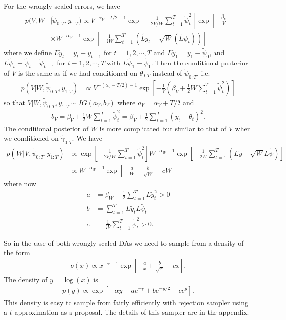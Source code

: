 \documentclass{article}
\begin{document}
For the wrongly scaled errors, we have
\begin{align}
  p(V,W&|\tilde{\psi}_{0:T},y_{1:T}) \propto V^{-\alpha_V - T/2 -1}\exp\left[-\frac{1}{2V/W}\sum_{t=1}^T\tilde{\psi}_t^2\right]\exp\left[-\frac{\beta_V}{V}\right]\nonumber\\
  &\times W^{-\alpha_W-1}\exp\left[-\frac{1}{2W}\sum_{t=1}^T\left(\tilde{Ly}_t - \sqrt{W}(\tilde{L\psi}_t)\right)\right]\label{llmwerrorpost}
\end{align}
where we define $L\tilde{y}_t = y_t - y_{t-1}$ for $t=1,2,\cdots,T$ and $L\tilde{y}_1=y_1 - \tilde{\psi}_0$, and $L\tilde{\psi}_t=\tilde{\psi}_t-\tilde{\psi}_{t-1}$ for $t=1,2,\cdots,T$ with $L\tilde{\psi}_1=\tilde{\psi}_1$. Then the conditional posterior of $V$ is the same as if we had conditioned on $\theta_{0:T}$ instead of $\tilde{\psi}_{0:T}$, i.e.
\begin{align*}
  p(V|W,\tilde{\psi}_{0:T},y_{1:T}) & \propto V^{-(\alpha_V - T/2)-1}\exp\left[-\frac{1}{V}\left(\beta_V + \frac{1}{2}W\sum_{t=1}^T\tilde{\psi}_t^2\right)\right]
\end{align*}
so that $V|W,\tilde{\psi}_{0:T},y_{1:T}\sim IG(a_V, b_V)$ where $a_V = \alpha_V + T/2$ and
\begin{align*}
  b_V = \beta_V + \frac{1}{2}W\sum_{t=1}^T\tilde{\psi}_t^2 = \beta_V + \frac{1}{2}\sum_{t=1}^T(y_t - \theta_t)^2.
\end{align*}
The conditional posterior of $W$ is more complicated but similar to that of $V$ when we conditioned on $\tilde{\gamma}_{0:T}$. We have
\begin{align*}
  p(W|V,\tilde{\psi}_{0:T},y_{1:T}) &\propto \exp\left[-\frac{1}{2V/W}\sum_{t=1}^T\tilde{\psi}_t^2\right] W^{-\alpha_W-1}\exp\left[-\frac{1}{2W}\sum_{t=1}^T\left(L\tilde{y} - \sqrt{W}L\tilde{\psi}\right)\right]\\
  &\propto W^{-\alpha_W - 1}\exp\left[-\frac{a}{W} + \frac{b}{\sqrt{W}} - cW\right]
\end{align*}
where now
\begin{align*}
  a & = \beta_W + \frac{1}{2}\sum_{t=1}^TL\tilde{y}_t^2 > 0\\
  b & = \sum_{t=1}^TL\tilde{y}_tL\tilde{\psi}_t\\
  c & = \frac{1}{2V}\sum_{t=1}^T\tilde{\psi}_t^2 > 0.
\end{align*}

So in the case of both wrongly scaled DAs we need to sample from a density of the form
\begin{align*}
  p(x) \propto x^{-\alpha -1}\exp\left[-\frac{a}{x} + \frac{b}{\sqrt{x}} - cx\right].
\end{align*}
The density of $y=\log(x)$ is 
\begin{align*}
  p(y) \propto \exp\left[-\alpha y - ae^{-y} + be^{-y/2} - ce^y\right].
\end{align*}
This density is easy to sample from fairly efficiently with rejection sampler using a $t$ approximation as a proposal. The details of this sampler are in the appendix.
\end{document}
